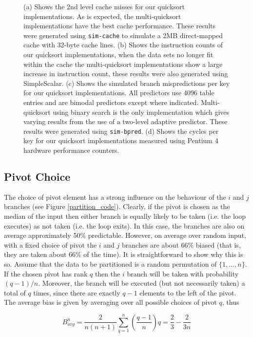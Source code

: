 \documentclass[acmtocl]{acmtrans2m}
\begin{document}
\begin{figure}
\caption{(a) Shows the 2nd level cache misses for our quicksort implementations.
As is expected, the multi-quicksort implementations have the best cache
performance. These results were generated using \texttt{sim-cache} to simulate a
2MB direct-mapped cache with 32-byte cache lines.  (b) Shows the instruction
counts of our quicksort implementations, when the data sets no longer fit within
the cache the multi-quicksort implementations show a large increase in
instruction count, these results were also generated using SimpleScalar. (c)
Shows the simulated branch mispredictions per key for our quicksort
implementations. All predictors use 4096 table entries and are bimodal
predictors except where indicated. Multi-quicksort using binary search is the
only implementation which gives varying results from the use of a two-level
adaptive predictor. These results were generated using \texttt{sim-bpred}. (d)
Shows the cycles per key for our quicksort implementations measured using
Pentium 4 hardware performance counters.  }
\label{quicksort_plots}
\end{figure}

\subsection{Pivot Choice}
\label{quicksort_pivot_choice}

The choice of pivot element has a strong influence on the behaviour of the $i$
and $j$ branches (see Figure \ref{partition_code}). Clearly, if the pivot is
chosen as the median of the input then either branch is equally likely to be
taken (i.e. the loop executes) as not taken (i.e.  the loop exits). In this
case, the branches are also on average approximately 50\% predictable.  However,
on average over random input, with a fixed choice of pivot the $i$ and $j$
branches are about 66\% biased (that is, they are taken about 66\% of the time).
It is straightforward to show why this is so. Assume that the data to be
partitioned is a random permutation of $\lbrace 1, \ldots, n \rbrace$.  If the
chosen pivot has rank $q$ then the $i$ branch will be taken with probability $(q
- 1)/n$.  Moreover, the branch will be executed (but not necessarily taken) a
total of $q$ times, since there are exactly $q - 1$ elements to the left of the
pivot. The average bias is given by averaging over all possible choices of pivot
$q$, thus

\begin{equation}
B_{avg}^n = \frac{2}{n(n + 1)}\sum_{q = 1}^n \left(\frac{q - 1}{n} \right) q = \frac{2}{3} - \frac{2}{3n} 
\label{bias_equation}\end{equation}
\end{document}
